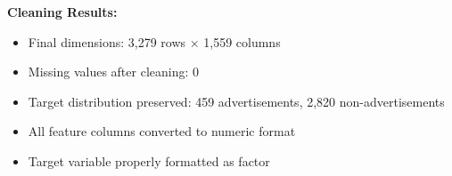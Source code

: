 \textbf{Cleaning Results:}
\begin{itemize}
    \item Final dimensions: 3,279 rows × 1,559 columns
    \item Missing values after cleaning: 0
    \item Target distribution preserved: 459 advertisements, 2,820 non-advertisements
    \item All feature columns converted to numeric format
    \item Target variable properly formatted as factor
\end{itemize}